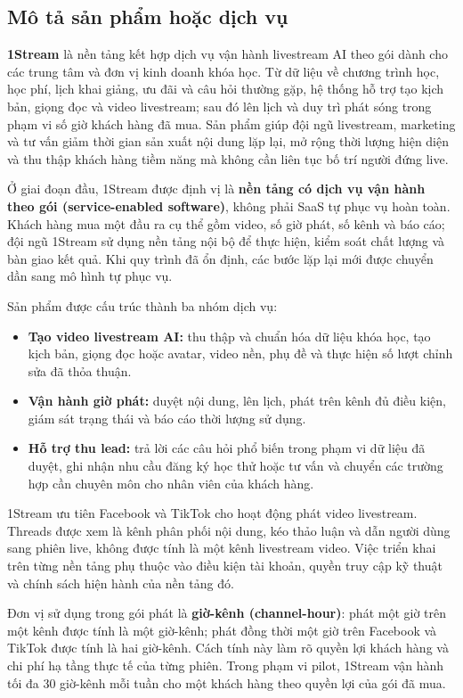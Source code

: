 \subsection{Mô tả sản phẩm hoặc dịch vụ}

\textbf{1Stream} là nền tảng kết hợp dịch vụ vận hành livestream AI theo gói
dành cho các trung tâm và đơn vị kinh doanh khóa học. Từ dữ liệu về chương trình
học, học phí, lịch khai giảng, ưu đãi và câu hỏi thường gặp, hệ thống hỗ trợ tạo
kịch bản, giọng đọc và video livestream; sau đó lên lịch và duy trì phát sóng
trong phạm vi số giờ khách hàng đã mua. Sản phẩm giúp đội ngũ livestream,
marketing và tư vấn giảm thời gian sản xuất nội dung lặp lại, mở rộng thời lượng
hiện diện và thu thập khách hàng tiềm năng mà không cần liên tục bố trí người
đứng live.

Ở giai đoạn đầu, 1Stream được định vị là \textbf{nền tảng có dịch vụ vận hành
theo gói (service-enabled software)}, không phải SaaS tự phục vụ hoàn toàn. Khách
hàng mua một đầu ra cụ thể gồm video, số giờ phát, số kênh và báo cáo; đội ngũ
1Stream sử dụng nền tảng nội bộ để thực hiện, kiểm soát chất lượng và bàn giao
kết quả. Khi quy trình đã ổn định, các bước lặp lại mới được chuyển dần sang mô
hình tự phục vụ.

Sản phẩm được cấu trúc thành ba nhóm dịch vụ:
\begin{itemize}
    \item \textbf{Tạo video livestream AI:} thu thập và chuẩn hóa dữ liệu khóa
    học, tạo kịch bản, giọng đọc hoặc avatar, video nền, phụ đề và thực hiện số
    lượt chỉnh sửa đã thỏa thuận.
    \item \textbf{Vận hành giờ phát:} duyệt nội dung, lên lịch, phát trên kênh
    đủ điều kiện, giám sát trạng thái và báo cáo thời lượng sử dụng.
    \item \textbf{Hỗ trợ thu lead:} trả lời các câu hỏi phổ biến trong phạm vi
    dữ liệu đã duyệt, ghi nhận nhu cầu đăng ký học thử hoặc tư vấn và chuyển các
    trường hợp cần chuyên môn cho nhân viên của khách hàng.
\end{itemize}

1Stream ưu tiên Facebook và TikTok cho hoạt động phát video livestream. Threads
được xem là kênh phân phối nội dung, kéo thảo luận và dẫn người dùng sang phiên
live, không được tính là một kênh livestream video. Việc triển khai trên từng
nền tảng phụ thuộc vào điều kiện tài khoản, quyền truy cập kỹ thuật và chính sách
hiện hành của nền tảng đó.

Đơn vị sử dụng trong gói phát là \textbf{giờ-kênh (channel-hour)}: phát một giờ
trên một kênh được tính là một giờ-kênh; phát đồng thời một giờ trên Facebook và
TikTok được tính là hai giờ-kênh. Cách tính này làm rõ quyền lợi khách hàng và
chi phí hạ tầng thực tế của từng phiên. Trong phạm vi pilot, 1Stream vận hành tối
đa 30 giờ-kênh mỗi tuần cho một khách hàng theo quyền lợi của gói đã mua.
